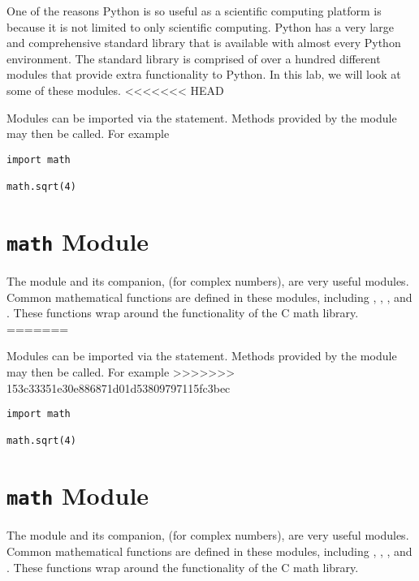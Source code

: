 
One of the reasons Python is so useful as a scientific computing platform is because it is not limited to only scientific computing.
Python has a very large and comprehensive standard library that is available with almost every Python environment.
The standard library is comprised of over a hundred different modules that provide extra functionality to Python.
In this lab, we will look at some of these modules.
<<<<<<< HEAD

Modules can be imported via the  statement. Methods provided by the module may then be called.  For example


\begin{lstlisting}
import math

math.sqrt(4)
\end{lstlisting}

\section*{\texttt{math} Module}
The  module and its companion,  (for complex numbers), are very useful modules.
Common mathematical functions are defined in these modules, including , , , and .  These functions wrap around the functionality of the C math library.
=======

Modules can be imported via the  statement. Methods provided by the module may then be called.  For example
>>>>>>> 153c33351e30e886871d01d53809797115fc3bec


\begin{lstlisting}
import math

math.sqrt(4)
\end{lstlisting}

\section*{\texttt{math} Module}
The  module and its companion,  (for complex numbers), are very useful modules.
Common mathematical functions are defined in these modules, including , , , and .  These functions wrap around the functionality of the C math library.

